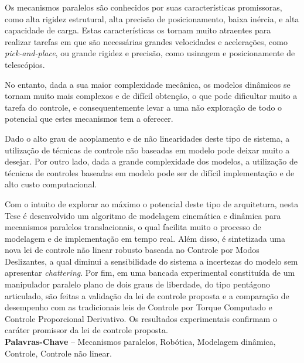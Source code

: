 \documentclass[]{politex}
\begin{document}
\begin{resumo}
Os mecanismos paralelos são conhecidos por suas características promissoras, como alta rigidez estrutural,  alta precisão de posicionamento, baixa inércia, e alta capacidade de carga. Estas características os tornam muito atraentes para realizar tarefas em que são necessárias grandes velocidades e acelerações, como {\em pick-and-place}, ou grande rigidez e precisão, como usinagem e posicionamente de telescópios.

No entanto, dada a sua maior complexidade mecânica, os modelos dinâmicos se tornam muito mais complexos e de difícil obtenção, o que pode dificultar muito a tarefa do controle, e consequentemente levar a uma não exploração de todo o potencial que estes mecanismos tem a oferecer.

Dado o alto grau de acoplamento e de não linearidades deste tipo de sistema, a utilização de técnicas de controle não baseadas em modelo pode deixar muito a desejar. Por outro lado, dada a grande complexidade dos modelos, a utilização de técnicas de controles baseadas em modelo pode ser de difícil implementação e de alto custo computacional.

Com o intuito de explorar ao máximo o potencial deste tipo de arquitetura, nesta Tese é desenvolvido um algoritmo de modelagem cinemática e dinâmica para mecanismos paralelos translacionais, o qual facilita muito o processo de modelagem e de implementação em tempo real. Além disso, é sintetizada uma nova lei de controle não linear robusto baseada no Controle por Modos Deslizantes, a qual diminui a sensibilidade do sistema a incertezas do modelo sem apresentar \emph{chattering}. Por fim, em uma bancada experimental constituída de um manipulador paralelo plano de dois graus de liberdade, do tipo pentágono articulado, são feitas a validação da lei de controle proposta e a comparação de desempenho com as tradicionais leis de Controle por Torque Computado e Controle Proporcional Derivativo. Os resultados experimentais confirmam o caráter promissor da lei de controle proposta.
%
\\[3\baselineskip]
%


\textbf{Palavras-Chave} -- Mecanismos paralelos, Robótica, Modelagem dinâmica, Controle, Controle não linear.
\end{resumo}
\end{document}
